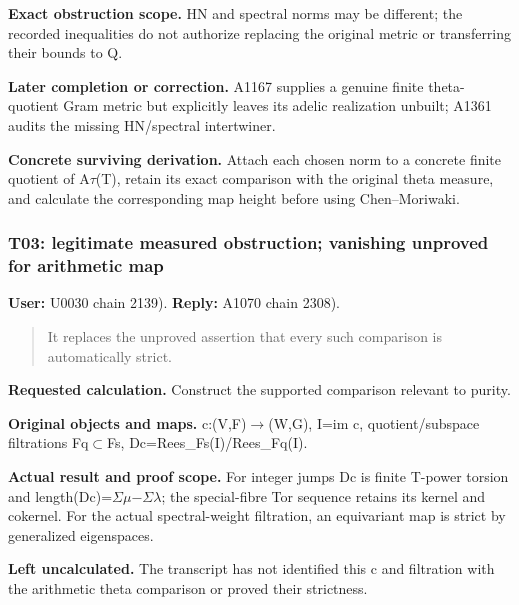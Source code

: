 \textbf{Exact obstruction scope.} HN and spectral norms may be
different; the recorded inequalities do not authorize replacing the
original metric or transferring their bounds to Q.

\textbf{Later completion or correction.} A1167 supplies a genuine finite
theta-quotient Gram metric but explicitly leaves its adelic realization
unbuilt; A1361 audits the missing HN/spectral intertwiner.

\textbf{Concrete surviving derivation.} Attach each chosen norm to a
concrete finite quotient of
A\allowbreak{}\ensuremath{τ}\allowbreak{}(T), retain its exact
comparison with the original theta measure, and calculate the
corresponding map height before using Chen--Moriwaki.

\subsubsection{T03: legitimate measured obstruction; vanishing unproved
for arithmetic
map}\label{TranscriptLedgerStage:t03-legitimate-measured-obstruction-vanishing-unproved-for-arithmetic-map}

\textbf{User:} U0030
\protect{} chain 2139).
\textbf{Reply:} A1070
\protect{} chain 2308).

\begin{quote}
It replaces the unproved assertion that every such comparison is
automatically strict.
\end{quote}

\textbf{Requested calculation.} Construct the supported comparison
relevant to purity.

\textbf{Original objects and maps.}
c:(V,F)\allowbreak{}\ensuremath{→}\allowbreak{}(W,G), I=im c,
quotient/subspace filtrations
Fq\allowbreak{}\ensuremath{⊂}\allowbreak{}Fs,
Dc=Rees\_Fs(I)/Rees\_Fq(I).

\textbf{Actual result and proof scope.} For integer jumps Dc is finite
T-power torsion and
length(Dc)=\allowbreak{}\ensuremath{Σ}\allowbreak{}\allowbreak{}\ensuremath{μ}\allowbreak{}\allowbreak{}\ensuremath{−}\allowbreak{}\allowbreak{}\ensuremath{Σ}\allowbreak{}\allowbreak{}\ensuremath{λ}\allowbreak{};
the special-fibre Tor sequence retains its kernel and cokernel. For the
actual spectral-weight filtration, an equivariant map is strict by
generalized eigenspaces.

\textbf{Left uncalculated.} The transcript has not identified this c and
filtration with the arithmetic theta comparison or proved their
strictness.

